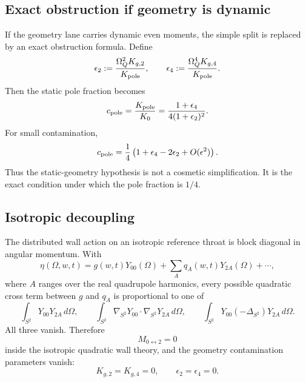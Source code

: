 \subsection{Exact obstruction if geometry is dynamic}
\label{subsec:app-part04-dynamic-geometry-obstruction}

If the geometry lane carries dynamic even moments, the simple split is replaced by an exact obstruction formula.  Define
\begin{equation}
\label{eq:app-part04-eps2-eps4}
\epsilon_2:=\frac{\Omega_Q^2K_{g,2}}{K_{\rm pole}},
\qquad
\epsilon_4:=\frac{\Omega_Q^4K_{g,4}}{K_{\rm pole}}.
\end{equation}
Then the static pole fraction becomes
\begin{equation}
\label{eq:app-part04-cpole-dynamic-geometry}
c_{\rm pole}
=
\frac{K_{\rm pole}}{K_0}
=
\frac{1+\epsilon_4}{4(1+\epsilon_2)^2}.
\end{equation}
For small contamination,
\begin{equation}
\label{eq:app-part04-cpole-small-expansion}
c_{\rm pole}
=
\frac14\left(1+\epsilon_4-2\epsilon_2+O(\epsilon^2)\right).
\end{equation}
Thus the static-geometry hypothesis is not a cosmetic simplification.  It is the exact condition under which the pole fraction is \(1/4\).

\subsection{Isotropic decoupling}
\label{subsec:app-part04-isotropic-decoupling}

The distributed wall action on an isotropic reference throat is block diagonal in angular momentum.  With
\begin{equation}
\eta(\Omega,w,t)
=
g(w,t)Y_{00}(\Omega)+\sum_A q_A(w,t)Y_{2A}(\Omega)+\cdots,
\end{equation}
where \(A\) ranges over the real quadrupole harmonics, every possible quadratic cross term between \(g\) and \(q_A\) is proportional to one of
\begin{equation}
\int_{S^2}Y_{00}Y_{2A}\,d\Omega,
\qquad
\int_{S^2}\nabla_{S^2}Y_{00}\cdot\nabla_{S^2}Y_{2A}\,d\Omega,
\qquad
\int_{S^2}Y_{00}(-\Delta_{S^2})Y_{2A}\,d\Omega.
\end{equation}
All three vanish.  Therefore
\begin{equation}
\label{eq:app-part04-l0-l2-block-zero}
M_{0\leftrightarrow2}=0
\end{equation}
inside the isotropic quadratic wall theory, and the geometry contamination parameters vanish:
\begin{equation}
\label{eq:app-part04-eps-zero-isotropic}
K_{g,2}=K_{g,4}=0,
\qquad
\epsilon_2=\epsilon_4=0.
\end{equation}

